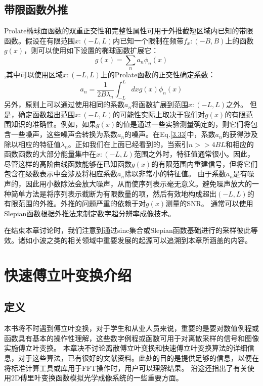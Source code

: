 \documentclass[10pt, UTF8]{ctexart}%
\numberwithin{equation}{section}
\numberwithin{figure}{section}
\newcommand{\InsertEqution}[2]{\begin{equation}
  \label{#1}
   #2
 \end{equation}}
\newcommand{\RefEq}[1]{Eq.\ref{#1}}
\newcommand{\InsertInlineEq}[1]{$#1$}
\begin{document}
\begin{sloppypar}
  \subsection{带限函数外推}
  Prolate椭球面函数的双重正交性和完整性属性可用于外推截短区域内已知的带限函数。假设在有限范围\InsertInlineEq{x:(-L,L)}内已知一个限制在频带\InsertInlineEq{f_x:(-B,B)}上的函数\InsertInlineEq{g(x)}，则可以使用如下设置的椭球函数扩展它：\InsertEqution{3.32}{g(x)=\sum_{n} a_{n} \phi_{n}(x)},其中可以使用区域\InsertInlineEq{x:(-L,L)}上的Prolate函数的正交性确定系数：\InsertEqution{3.33}{a_{n}=\frac{1}{2 B \lambda_{n}} \int_{-L}^{L} d x g(x) \phi_{n}(x)}
  另外，原则上可以通过使用相同的系数\InsertInlineEq{a_n}将函数扩展到范围\InsertInlineEq{x:(-L,L)}之外。 但是，确定函数超出范围\InsertInlineEq{x:(-L,L)}的可能性实际上取决于我们对\InsertInlineEq{g(x)}的有限范围知识的准确性。例如，如果\InsertInlineEq{g(x)}的值是通过一些实验测量确定的，则它们将包含一些噪声，这些噪声会转换为系数\InsertInlineEq{a_n}的噪声。在\RefEq{3.33}中，系数\InsertInlineEq{a_n}的获得涉及除以相应的特征值\InsertInlineEq{\lambda_n}。正如我们在上面已经看到的，当索引\InsertInlineEq{n>>4 B L}和相应的函数函数的大部分能量集中在\InsertInlineEq{x:(-L,L)}范围之外时，特征值通常很小。因此，尽管这样的高阶曲线函数能够在已知函数\InsertInlineEq{g(x)}的有限范围内重建信号，但将它们包含在级数表示中会涉及将相应系数\InsertInlineEq{a_n}除以非常小的特征值。 由于系数\InsertInlineEq{a_n}是有噪声的，因此用小数除法会放大噪声，从而使序列表示毫无意义。避免噪声放大的一种简单方法是将序列表示截断为有限数量的项，然后有效地构成超出\InsertInlineEq{(-L,L)}的有限范围的外推。外推的问题严重的依赖于对\InsertInlineEq{g(x)}测量的SNR。 通常可以使用Slepian函数根据外推法来制定数字超分辨率成像技术。

  在结束本章讨论时，我们注意到通过sinc集合或Slepian函数基础进行的采样彼此等效。诸如小波之类的相关领域中重要发展的起源可以追溯到本章所涵盖的内容。
\section{快速傅立叶变换介绍}
\subsection{定义}
本书将不时遇到傅立叶变换，对于学生和从业人员来说，重要的是要对数值例程或函数具有基本的操作性理解，这些数字例程或函数可用于对离散采样的信号和图像实施傅立叶变换。 本章决不讨论离散傅立叶变换和快速傅立叶变换算法的详细信息，对于这些算法，已有很好的文献资料。此处的目的是提供足够的信息，以便在将标准计算工具或库用于FFT操作时，用户可以理解结果。 沿途还指出了有关使用2D傅里叶变换函数模拟光学成像系统的一些重要方面。


\end{sloppypar}
\end{document}
